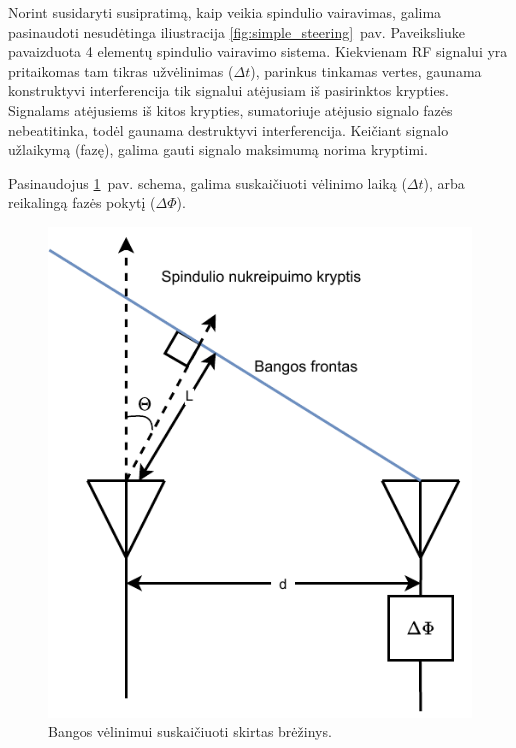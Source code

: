 \documentclass[main.tex]{subfiles}
\begin{document}
Norint susidaryti susipratimą, kaip veikia spindulio vairavimas, galima
pasinaudoti nesudėtinga iliustracija \ref{fig:simple_steering}~pav.
Paveiksliuke pavaizduota 4 elementų spindulio vairavimo sistema. Kiekvienam
RF signalui yra pritaikomas tam tikras užvėlinimas ($\Delta t$), parinkus
tinkamas vertes, gaunama konstruktyvi interferencija tik signalui atėjusiam
iš pasirinktos krypties. Signalams atėjusiems iš kitos krypties, sumatoriuje
atėjusio signalo fazės nebeatitinka, todėl gaunama destruktyvi interferencija.
Keičiant signalo užlaikymą (fazę), galima gauti signalo maksimumą norima
kryptimi.

Pasinaudojus \ref{fig:beamform_path}~pav. schema, galima suskaičiuoti vėlinimo laiką ($\Delta t$), arba reikalingą
fazės pokytį ($\Delta\Phi$).

\begin{figure}[h]
    \begin{centering}
    \includegraphics[scale=0.8]{drawings/beamform_path}
    \par\end{centering}
    \protect\caption{\label{fig:beamform_path}Bangos vėlinimui suskaičiuoti skirtas brėžinys.}
\end{figure}
\end{document}
